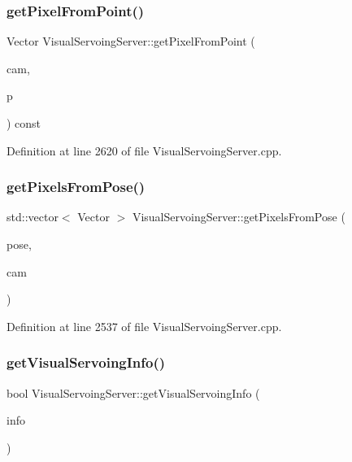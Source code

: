 \subsubsection{\texorpdfstring{get\+Pixel\+From\+Point()}{getPixelFromPoint()}}
{\footnotesize\ttfamily Vector Visual\+Servoing\+Server\+::get\+Pixel\+From\+Point (\begin{DoxyParamCaption}\item[{const Cam\+Sel \&}]{cam,  }\item[{const yarp\+::sig\+::\+Vector \&}]{p }\end{DoxyParamCaption}) const\hspace{0.3cm}{\ttfamily [private]}}



Definition at line 2620 of file Visual\+Servoing\+Server.\+cpp.

\mbox{\label{classVisualServoingServer_a04f3caed0ac350b3579efeb4cd548eb8}} 
\subsubsection{\texorpdfstring{get\+Pixels\+From\+Pose()}{getPixelsFromPose()}}
{\footnotesize\ttfamily std\+::vector$<$ Vector $>$ Visual\+Servoing\+Server\+::get\+Pixels\+From\+Pose (\begin{DoxyParamCaption}\item[{const yarp\+::sig\+::\+Vector \&}]{pose,  }\item[{const Cam\+Sel \&}]{cam }\end{DoxyParamCaption})\hspace{0.3cm}{\ttfamily [private]}}



Definition at line 2537 of file Visual\+Servoing\+Server.\+cpp.

\mbox{\label{classVisualServoingServer_a66db1dfa1ebde34ada94bc36248e2ec8}} 
\subsubsection{\texorpdfstring{get\+Visual\+Servoing\+Info()}{getVisualServoingInfo()}}
{\footnotesize\ttfamily bool Visual\+Servoing\+Server\+::get\+Visual\+Servoing\+Info (\begin{DoxyParamCaption}\item[{yarp\+::os\+::\+Bottle \&}]{info }\end{DoxyParamCaption})\hspace{0.3cm}{\ttfamily [override]}}



